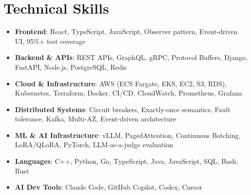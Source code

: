 \documentclass[letterpaper,11pt]{article}
\newcommand{\resumeSubHeadingListStart}{\begin{itemize}[leftmargin=0.15in, label={}]}
\newcommand{\resumeSubHeadingListEnd}{\end{itemize}}
\newcommand{\resumeSkillHeading}[2]{%
  \item\small{\textbf{#1}: #2 \vspace{-9pt}}%
}
\begin{document}
\section{Technical Skills}
  \resumeSubHeadingListStart
    \resumeSkillHeading{Frontend}{React, TypeScript, JavaScript, Observer pattern, Event-driven UI, 95\%+ test coverage}
    \resumeSkillHeading{Backend \& APIs}{REST APIs, GraphQL, gRPC, Protocol Buffers, Django, FastAPI, Node.js, PostgreSQL, Redis}
    \resumeSkillHeading{Cloud \& Infrastructure}{AWS (ECS Fargate, EKS, EC2, S3, RDS), Kubernetes, Terraform, Docker, CI/CD, CloudWatch, Prometheus, Grafana}
    \resumeSkillHeading{Distributed Systems}{Circuit breakers, Exactly-once semantics, Fault tolerance, Kafka, Multi-AZ, Event-driven architecture}
    \resumeSkillHeading{ML \& AI Infrastructure}{vLLM, PagedAttention, Continuous Batching, LoRA/QLoRA, PyTorch, LLM-as-a-judge evaluation}
    \resumeSkillHeading{Languages}{C++, Python, Go, TypeScript, Java, JavaScript, SQL, Bash, Rust}
    \resumeSkillHeading{AI Dev Tools}{Claude Code, GitHub Copilot, Codex, Cursor}
  \resumeSubHeadingListEnd
\end{document}
